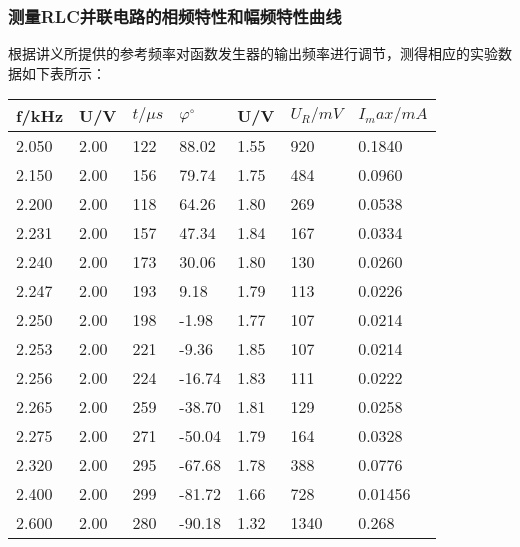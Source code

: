 \documentclass[UTF-8,twoside,cs4size]{ctexart}
\begin{document}
        \subsubsection{测量RLC并联电路的相频特性和幅频特性曲线}
            根据讲义所提供的参考频率对函数发生器的输出频率进行调节，测得相应的实验数据如下表所示：
            \begin{table}[!h]
                \centering
                \begin{tabular}{|l|l|l|l|l|l|l|}
                \hline
                    f/kHz & U/V & $t/\mu s$ & $\varphi^{\circ}$ & U/V & $U_R/mV$ & $I_max/mA$ \\ \hline
                    2.050 & 2.00 & 122 & 88.02  & 1.55 & 920  & 0.1840  \\ \hline
                    2.150 & 2.00 & 156 & 79.74  & 1.75 & 484  & 0.0960  \\ \hline
                    2.200 & 2.00 & 118 & 64.26  & 1.80 & 269 & 0.0538  \\ \hline
                    2.231 & 2.00 & 157 & 47.34  & 1.84 & 167  & 0.0334  \\ \hline
                    2.240 & 2.00 & 173 & 30.06  & 1.80 & 130  & 0.0260  \\ \hline
                    2.247 & 2.00 & 193 & 9.18 & 1.79 & 113  & 0.0226  \\ \hline
                    2.250 & 2.00 & 198 & -1.98 & 1.77 & 107  & 0.0214  \\ \hline
                    2.253 & 2.00 & 221 & -9.36  & 1.85 & 107  & 0.0214  \\ \hline
                    2.256 & 2.00 & 224 & -16.74  & 1.83 & 111  & 0.0222  \\ \hline
                    2.265 & 2.00 & 259 & -38.70  & 1.81 & 129  & 0.0258  \\ \hline
                    2.275 & 2.00 & 271 & -50.04  & 1.79 & 164  & 0.0328  \\ \hline
                    2.320 & 2.00 & 295 & -67.68  & 1.78 & 388  & 0.0776  \\ \hline
                    2.400 & 2.00 & 299 & -81.72  & 1.66 & 728 & 0.01456 \\ \hline
                    2.600 & 2.00 & 280 & -90.18  & 1.32 & 1340 & 0.268 \\ \hline
                \end{tabular}
            \end{table}
\end{document}
